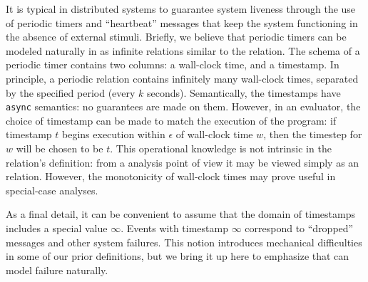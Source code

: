 
It is typical in distributed systems to guarantee system liveness through the use of periodic timers and ``heartbeat'' messages that keep the system functioning in the absence of external stimuli.  Briefly, we believe that periodic timers can be modeled naturally in \lang as infinite relations similar to the \lang {} relation.  The schema of a periodic timer contains two columns: a wall-clock time, and a \lang timestamp.  In principle, a periodic relation contains infinitely many wall-clock times, separated by the specified period (every $k$ seconds).  Semantically, the \lang timestamps have {\tt async} semantics: no guarantees are made on them.  However, in an evaluator, the choice of timestamp can be made to match the execution of the program: if \lang timestamp $t$ begins execution within $\epsilon$ of wall-clock time $w$, then the \lang timestep for $w$ will be chosen to be $t$.  This operational knowledge is not intrinsic in the relation's definition: from a \lang analysis point of view it may be viewed simply as an  relation.  However, the monotonicity of wall-clock times may prove useful in special-case analyses.

As a final detail, it can be convenient to assume that the domain of \lang timestamps includes a special value $\infty$.  Events with  timestamp $\infty$ correspond to ``dropped'' messages and other system failures.  This notion introduces mechanical difficulties in some of our prior definitions, but we bring it up here to emphasize that \lang can model failure naturally.
